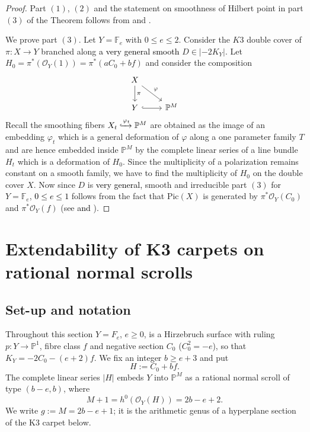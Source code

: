 \documentclass[11pt,twoside]{amsart}
\theoremstyle{plain}
\theoremstyle{definition}
\newcommand{\PP}{\mathbb{P}}
\newcommand{\PM}{\mathbb{P}^M}
\newcommand{\OO}{\mathcal{O}}
\begin{document}
\begin{proof} Part $(1)$, $(2)$ and the statement on smoothness of Hilbert point in part $(3)$ of the Theorem follows from \cite[Theorem $3.1 (3)$, Theorem $4.3$, Theorem $4.4$, Theorem $5.1$]{BMR21} and \cite[Proposition $1.7$, Theorem $3.5$, Theorem $4.1$]{GP97}.
    

We prove part $(3)$. Let $Y = \mathbb{F}_e$ with $0 \leq e \leq 2$. Consider the $K3$ double cover of $\pi:X \to Y$ branched along \textcolor{black}{a very general smooth} $D \in |-2K_Y|$. Let $H_0 = \pi^*(\mathcal{O}_{Y}(1)) = \pi^*(aC_0+bf)$ and consider the composition  
\[
\begin{tikzcd}
X \arrow[dr, "\varphi"] \arrow[d, "\pi"] & \\
Y \arrow[r, hook] & \mathbb{P}^M
\end{tikzcd}
\]
Recall the smoothing fibers $X_t \xhookrightarrow{\varphi_t} \mathbb{P}^M$ are obtained as the image of an embedding $\varphi_t$ which is a general deformation of $\varphi$ along a one parameter family $T$ and are hence embedded inside $\mathbb{P}^M$ by the complete linear series of a line bundle $H_t$ which is a deformation of $H_0$. Since the multiplicity of a polarization remains constant on a smooth family, we have to find the multiplicity of $H_0$ on the double cover $X$. Now since $D$ is \textcolor{black}{very general,} smooth and irreducible part $(3)$ for $Y = \mathbb{F}_e$, \textcolor{black}{$0 \leq e \leq 1$} follows from the fact that $\textrm{Pic}(X)$ is generated by $\pi^*\mathcal{O}_Y(C_0)$ and $\pi^*\mathcal{O}_Y(f)$ (see \cite[Proposition $6.3$]{AHL10} \textcolor{black}{and \cite[Proposition $6.5$ (i), (iii)]{AHL10}}).

\end{proof}

\section{Extendability of K3 carpets on rational normal scrolls}\label{sec:carpets}



\subsection{Set-up and notation}\label{subsec:setup}

Throughout this section $Y=F_e$, $e\ge 0$, is a Hirzebruch surface with ruling $p\colon Y\to\PP^1$, fibre class $f$ and negative section $C_0$ ($C_0^2=-e$), so that $K_Y=-2C_0-(e+2)f$. We fix an integer $b\ge e+3$ and put
\[
H:=C_0+bf .
\]
The complete linear series $|H|$ embeds $Y$ into $\PM$ as a rational normal scroll of type $(b-e,b)$, where
\[
M+1=h^0(\OO_Y(H))=2b-e+2 .
\]
We write $g:=M=2b-e+1$; it is the arithmetic genus of a hyperplane section of the K3 carpet below.
\end{document}
